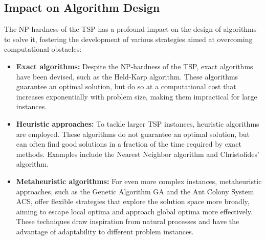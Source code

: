 \subsection{Impact on Algorithm Design}

The \Gls{NP}-hardness of the \Gls{TSP} has a profound impact on the design of algorithms to solve it, fostering the development of various strategies aimed at overcoming computational obstacles:

\begin{itemize}
	\item \textbf{Exact algorithms:} Despite the \Gls{NP}-hardness of the \Gls{TSP}, exact algorithms have been devised, such as the Held-Karp algorithm. These algorithms guarantee an optimal solution, but do so at a computational cost that increases exponentially with problem size, making them impractical for large instances.
	\item \textbf{Heuristic approaches:} To tackle larger \Gls{TSP} instances, heuristic algorithms are employed. These algorithms do not guarantee an optimal solution, but can often find good solutions in a fraction of the time required by exact methods. Examples include the Nearest Neighbor algorithm and Christofides' algorithm.
  \item \textbf{Metaheuristic algorithms:} For even more complex instances, metaheuristic approaches, such as the Genetic Algorithm \Gls{GA} and the Ant Colony System \Gls{ACS}, offer flexible strategies that explore the solution space more broadly, aiming to escape local optima and approach global optima more effectively. These techniques draw inspiration from natural processes and have the advantage of adaptability to different problem instances.
\end{itemize}

